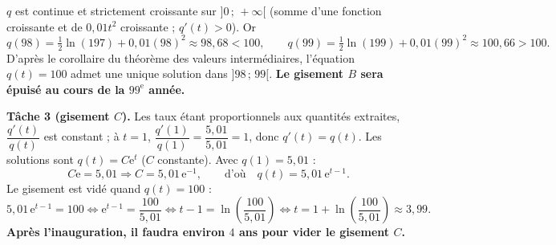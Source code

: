 $q$ est continue et strictement croissante sur $]0\,;\,+\infty[$ (somme d'une fonction croissante
et de $0{,}01t^2$ croissante ; $q'(t)>0$). Or
\[ q(98)=\tfrac12\ln(197)+0{,}01(98)^2\approx98{,}68<100,\qquad q(99)=\tfrac12\ln(199)+0{,}01(99)^2\approx100{,}66>100. \]
D'après le corollaire du théorème des valeurs intermédiaires, l'équation $q(t)=100$ admet une
unique solution dans $]98\,;\,99[$. \textbf{Le gisement $B$ sera épuisé au cours de la $99^{\text{e}}$ année.}

\smallskip
\noindent\textbf{Tâche 3 (gisement $C$).} Les taux étant proportionnels aux quantités extraites,
$\dfrac{q'(t)}{q(t)}$ est constant ; à $t=1$, $\dfrac{q'(1)}{q(1)}=\dfrac{5{,}01}{5{,}01}=1$, donc $q'(t)=q(t)$.
Les solutions sont $q(t)=C\mathrm{e}^{t}$ ($C$ constante). Avec $q(1)=5{,}01$ :
\[ C\mathrm{e}=5{,}01\Rightarrow C=5{,}01\,\mathrm{e}^{-1},\qquad\text{d'où}\quad q(t)=5{,}01\,\mathrm{e}^{t-1}. \]
Le gisement est vidé quand $q(t)=100$ :
\[ 5{,}01\,\mathrm{e}^{t-1}=100\iff\mathrm{e}^{t-1}=\frac{100}{5{,}01}\iff t-1=\ln\!\left(\frac{100}{5{,}01}\right)\iff
t=1+\ln\!\left(\frac{100}{5{,}01}\right)\approx3{,}99. \]
\textbf{Après l'inauguration, il faudra environ $4$ ans pour vider le gisement $C$.}
